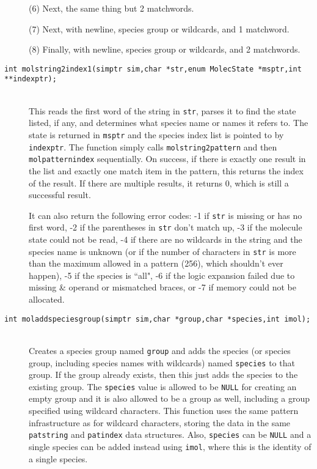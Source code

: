 \documentclass {scrbook}
\newcommand {\ttt} {\texttt}
\begin{document}
\begin{description}
(6) Next, the same thing but 2 matchwords.

(7) Next, with newline, species group or wildcards, and 1 matchword.

(8) Finally, with newline, species group or wildcards, and 2 matchwords.

\item[\ttt{int molstring2index1(simptr sim,char *str,enum MolecState *msptr,int **indexptr);}]
\hfill \\
This reads the first word of the string in \ttt{str}, parses it to find the state listed, if any, and determines what species name or names it refers to. The state is returned in \ttt{msptr} and the species index list is pointed to by \ttt{indexptr}. The function simply calls \ttt{molstring2pattern} and then \ttt{molpatternindex} sequentially. On success, if there is exactly one result in the list and exactly one match item in the pattern, this returns the index of the result. If there are multiple results, it returns 0, which is still a successful result.

It can also return the following error codes: -1 if \ttt{str} is missing or has no first word, -2 if the parentheses in \ttt{str} don't match up, -3 if the molecule state could not be read, -4 if there are no wildcards in the string and the species name is unknown (or if the number of characters in \ttt{str} is more than the maximum allowed in a pattern (256), which shouldn't ever happen), -5 if the species is ``all", -6 if the logic expansion failed due to missing \& operand or mismatched braces, or -7 if memory could not be allocated.

\item[\ttt{int moladdspeciesgroup(simptr sim,char *group,char *species,int imol);}]
\hfill \\
Creates a species group named \ttt{group} and adds the species (or species group, including species names with wildcards) named \ttt{species} to that group. If the group already exists, then this just adds the species to the existing group. The \ttt{species} value is allowed to be \ttt{NULL} for creating an empty group and it is also allowed to be a group as well, including a group specified using wildcard characters. This function uses the same pattern infrastructure as for wildcard characters, storing the data in the same \ttt{patstring} and \ttt{patindex} data structures. Also, \ttt{species} can be \ttt{NULL} and a single species can be added instead using \ttt{imol}, where this is the identity of a single species.


\end{description}
\end{document}
